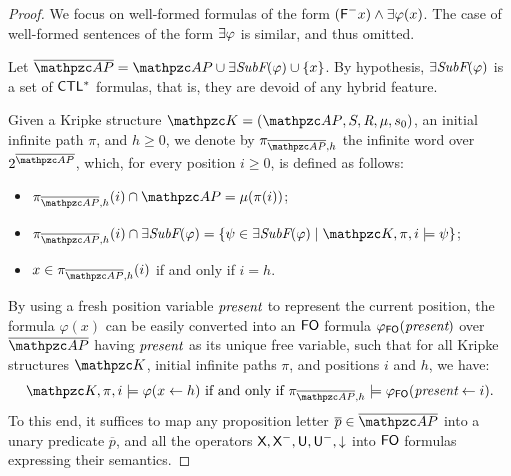 \begin{proof} We focus on well-formed formulas of the form  $(\textsf{F}^{-} x)\wedge \exists \varphi(x)$. The case of well-formed sentences of the form $\exists\varphi$ is similar, and thus omitted.

Let $\overline{\Prop}= \Prop\cup  \EQSubf(\varphi) \cup \{x\}$. By hypothesis, $\exists\textit{SubF}(\varphi)$ is a set of $\text{\sffamily CTL$^{*}$}$ formulas, that is, they are devoid of any hybrid feature.

Given a Kripke structure $\Ku=\KuDef$,  an initial infinite path $\pi$, and $h\geq 0$, we denote by $\pi_{\overline{\Prop},h}$ the infinite word over $2^{\overline{\Prop}}$, which, for every position $i\geq 0$, is defined as follows:
 \begin{itemize}
 \item $\pi_{\overline{\Prop},h}(i)\cap \Prop =\Lab(\pi(i))$;
 \item $\pi_{\overline{\Prop},h}(i)\cap \EQSubf(\varphi)= \{\psi\in \EQSubf(\varphi)\mid \Ku,\pi,i\models \psi\}$;
 \item $x\in \pi_{\overline{\Prop},h}(i)$ if and only if $i=h$.
 \end{itemize}

 By using a fresh position variable $\textit{present}$ to represent the current position, the formula $\varphi(x)$ can be easily converted into an $\text{\sffamily FO}$ formula
 $\varphi_{\text{\sffamily FO}}(\textit{present})$
 over $ \overline{\Prop}$ having $\textit{present}$ as its unique free variable, such that for all Kripke structures $\Ku$, initial infinite paths $\pi$, and positions $i$ and $h$, we have:
 \begin{equation}\label{eq:UsingSeparationHybridCTL1}
  \Ku,\pi,i\models \varphi(x \leftarrow h) \text{ if and only if } \pi_{\overline{\Prop},h} \models \varphi_\FO(\present \leftarrow i).
\end{equation}
To this end, it suffices to map any proposition letter $\overline{p}\in \overline{\Prop}$ into a unary predicate $\overline{p}$,  and all the operators $\textsf{X},\textsf{X}^{-},\textsf{U},\textsf{U}^{-},\downarrow$ into  $\text{\sffamily FO}$ formulas expressing their semantics.


\end{proof}
